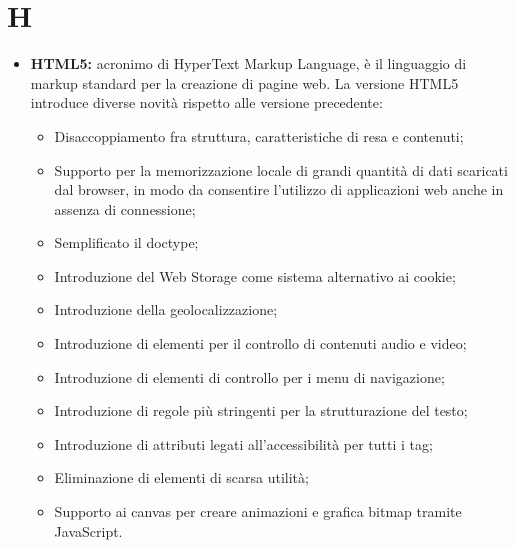 \section*{\Huge H} %
\label{sec:h}
	\begin{itemize}
		\item \textbf{HTML5:} acronimo di HyperText Markup Language, è il linguaggio di markup standard per la creazione di pagine web. La versione HTML5 introduce diverse novità rispetto alle versione precedente:
		 \begin{itemize}
		 	\item Disaccoppiamento fra struttura, caratteristiche di resa e contenuti;
		 	\item Supporto per la memorizzazione locale di grandi quantità di dati scaricati dal browser, in modo da consentire l'utilizzo di applicazioni web anche in assenza di connessione;
		 	\item Semplificato il doctype;
		 	\item Introduzione del Web Storage come sistema alternativo ai cookie;
		 	\item Introduzione della geolocalizzazione;
			\item Introduzione di elementi per il controllo di contenuti audio e video;
			\item Introduzione di elementi di controllo per i menu di navigazione;
			\item Introduzione di regole più stringenti per la strutturazione del testo;
			\item Introduzione di attributi legati all'accessibilità per tutti i tag;
			\item Eliminazione di elementi di scarsa utilità;
			\item Supporto ai canvas per creare animazioni e grafica bitmap tramite JavaScript.
		 \end{itemize}
	\end{itemize}
\pagebreak

